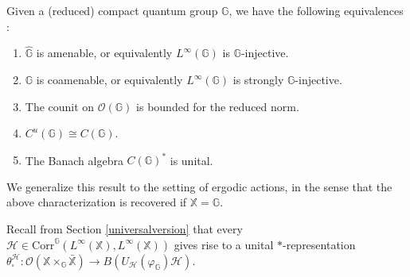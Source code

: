 \documentclass[reqno]{amsart}
\numberwithin{equation}{section}
\newcommand\XGX{\X\times_\G \bar{\X}}
\newcommand{\mcH}{\mathcal{H}}
\newcommand{\mcO}{\mathcal{O}}
\newcommand{\G}{\mathbb{G}}
\newcommand{\X}{\mathbb{X}}
\newcommand{\Corr}{\mathrm{Corr}}
\begin{document}
Given a (reduced) compact quantum group $\G$, we have the following equivalences \cites{BMT01, BT03, Tom06, Cr17, DH24, DCDR25, DR26}:
\begin{enumerate}
    \item\vspace{-1.5mm} $\hat{\G}$ is amenable, or equivalently $L^\infty(\G)$ is $\G$-injective.
    \item\vspace{-1.5mm} $\G$ is coamenable, or equivalently $L^\infty(\G)$ is strongly $\G$-injective.
        \item \vspace{-1.5mm}The counit on $\mcO(\G)$ is bounded for the reduced norm.
    \item \vspace{-1.5mm}$C^u(\G)\cong C(\G)$.
    \item \vspace{-1.5mm} The Banach algebra $C(\G)^*$ is unital.
\end{enumerate}

We generalize this result to the setting of ergodic actions, in the sense that the above characterization is recovered if $\X = \G$. 

Recall from Section \ref{universalversion} that every $\mcH\in \Corr^\G(L^\infty(\X), L^\infty(\X))$ gives rise to a unital $*$-representation $\theta_\square^\mcH: \mcO(\XGX)\to B(U_\mcH(\varphi_\G)\mcH)$.
\end{document}
